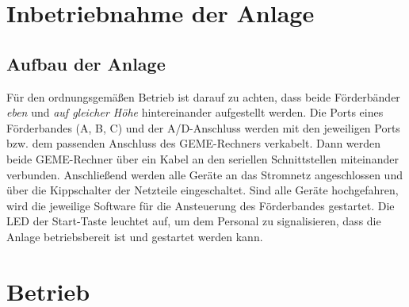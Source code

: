 \documentclass[oneside,a4paper,titlepage]{scrartcl} %
\begin{document}
\section{Inbetriebnahme der Anlage}
\subsection{Aufbau der Anlage}
Für den ordnungsgemäßen Betrieb ist darauf zu achten, dass beide Förderbänder \emph{eben} und \emph{auf gleicher Höhe} hintereinander aufgestellt werden.\newline
\newline
Die Ports eines Förderbandes (A, B, C) und der A/D-Anschluss werden mit den jeweiligen Ports bzw. dem passenden Anschluss des GEME-Rechners verkabelt.\newline
\newline
Dann werden beide GEME-Rechner über ein Kabel an den seriellen Schnittstellen miteinander verbunden.\newline
\newline
Anschließend werden alle Geräte an das Stromnetz angeschlossen und über die Kippschalter der Netzteile eingeschaltet.\newline
\newline
Sind alle Geräte hochgefahren, wird die jeweilige Software für die Ansteuerung des Förderbandes gestartet.\newline
\newline
Die LED der Start-Taste leuchtet auf, um dem Personal zu signalisieren, dass die Anlage betriebsbereit ist und gestartet werden kann.
\newpage

\section{Betrieb}
\end{document}
